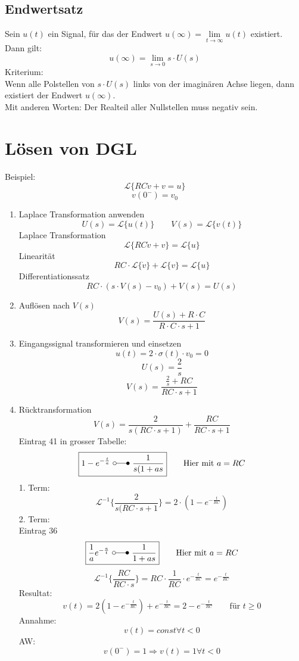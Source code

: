 \subsection{Endwertsatz}
Sein $u(t)$ ein Signal, für das der Endwert 
$u(\infty) = \lim\limits_{t \to \infty} u(t)$ existiert. \\
Dann gilt: 
\[ u(\infty) = \lim\limits_{s \to 0} s \cdot U(s) \]
Kriterium: \\
Wenn alle Polstellen von $s \cdot U(s)$ links von der imaginären Achse liegen, 
dann existiert der Endwert $u(\infty)$. \\
Mit anderen Worten: Der Realteil aller Nullstellen muss negativ sein. 

\section{Lösen von DGL}
Beispiel:
\[ \mathcal{L} \{ R C \dot{v} + v = u \} \]
\[ v(0^-) = v_0 \]
\begin{enumerate}
  \item Laplace Transformation anwenden
        \[ U(s) = \mathcal{L} \{ u(t) \} \qquad V(s) = \mathcal{L} \{ v(t) \} \]
        Laplace Transformation
        \[ \mathcal{L} \{ R C \dot{v} + v \} = \mathcal{L} \{ u \} \]
        Linearität
        \[ R C \cdot \mathcal{L} \{ \dot{v} \} + \mathcal{L} \{ v \} 
        = \mathcal{L} \{ u \} \]
        Differentiationssatz
        \[ R C \cdot ( s \cdot V(s) - v_0 )  + V(s) = U(s) \]
  \item Auflösen nach $V(s)$
        \[ \boxed{V(s) = \frac{U(s) + R \cdot C}{R \cdot C \cdot s + 1}} \]
  \item Eingangssignal transformieren und einsetzen
        \[ u(t) = 2 \cdot \sigma(t) \cdot v_0 = 0 \]
        \[ U(s) = \frac{2}{s} \]
        \[ V(s) = \frac{\frac{2}{s} + RC}{RC \cdot s + 1} \]
  \item Rücktransformation
        \[ V(s) = \frac{2}{s (RC \cdot s + 1)}  + \frac{RC}{RC \cdot s + 1} \]
        Eintrag 41 in grosser Tabelle: 
        \[ \boxed{1 - e^{-\frac{t}{a}} ~ \laplace ~ \frac{1}{s(1 + a s}} 
        \qquad \text{Hier mit }a = RC \]
        1. Term: 
        \[ \mathcal{L}^{-1} \{ \frac{2}{s(RC \cdot s + 1} \} 
        = 2 \cdot (1 - e^{-\frac{t}{RC}}) \]
        2. Term: \\
        Eintrag 36
        \[ \boxed{\frac{1}{a} e^{-\frac{a}{t}} ~ \laplace ~ \frac{1}{1 + a s}} 
        \qquad \text{Hier mit }a = RC \]
        \[ \mathcal{L}^{-1} \{ \frac{RC}{RC \cdot s} \} 
        = RC \cdot \frac{1}{RC} \cdot e^{-\frac{t}{RC}} = e^{-\frac{t}{RC}} \]
        Resultat: 
        \[ v(t) = 2 (1 - e^{-\frac{t}{RC}}) + e^{-\frac{t}{RC}} 
        = 2 - e^{-\frac{t}{RC}} \qquad \text{für }t \geq 0 \]
        Annahme: 
        \[ v(t) = const \forall t < 0 \]
        AW: 
        \[ v(0^-) = 1 \Rightarrow v(t) = 1 \forall t < 0 \] 
\end{enumerate}

